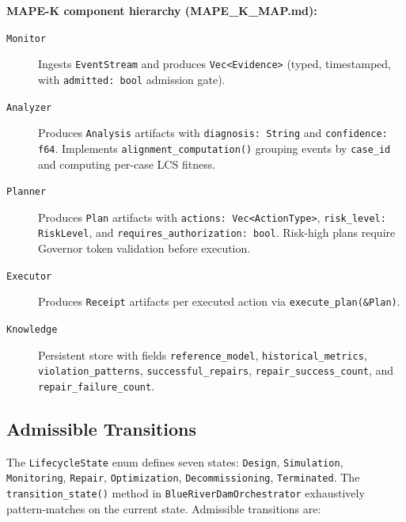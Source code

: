 \textbf{MAPE-K component hierarchy (MAPE\_K\_MAP.md):}
\begin{description}
  \item[\texttt{Monitor}] Ingests \texttt{EventStream} and produces
    \texttt{Vec<Evidence>} (typed, timestamped, with \texttt{admitted: bool}
    admission gate).
  \item[\texttt{Analyzer}] Produces \texttt{Analysis} artifacts with
    \texttt{diagnosis: String} and \texttt{confidence: f64}. Implements
    \texttt{alignment\_computation()} grouping events by \texttt{case\_id}
    and computing per-case LCS fitness.
  \item[\texttt{Planner}] Produces \texttt{Plan} artifacts with
    \texttt{actions: Vec<ActionType>}, \texttt{risk\_level: RiskLevel}, and
    \texttt{requires\_authorization: bool}. Risk-high plans require Governor
    token validation before execution.
  \item[\texttt{Executor}] Produces \texttt{Receipt} artifacts per executed
    action via \texttt{execute\_plan(\&Plan)}.
  \item[\texttt{Knowledge}] Persistent store with fields
    \texttt{reference\_model}, \texttt{historical\_metrics},
    \texttt{violation\_patterns}, \texttt{successful\_repairs},
    \texttt{repair\_success\_count}, and \texttt{repair\_failure\_count}.
\end{description}

\subsection{Admissible Transitions}
\label{sec:blue-river-dam-architecture-transitions}

The \texttt{LifecycleState} enum defines seven states:
\texttt{Design}, \texttt{Simulation}, \texttt{Monitoring}, \texttt{Repair},
\texttt{Optimization}, \texttt{Decommissioning}, \texttt{Terminated}.
The \texttt{transition\_state()} method in \texttt{BlueRiverDamOrchestrator}
exhaustively pattern-matches on the current state. Admissible transitions are:

